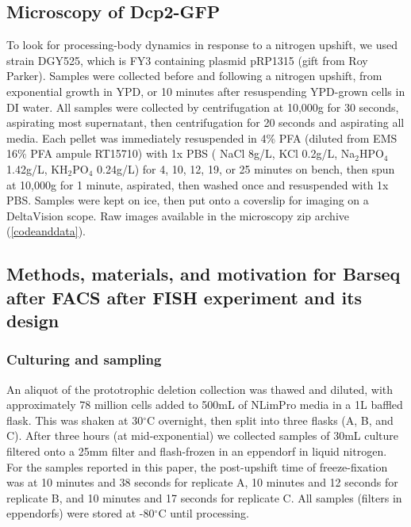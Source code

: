 \subsection{Microscopy of Dcp2-GFP}

To look for processing-body dynamics in response to
a nitrogen upshift, we used strain DGY525, which is FY3
containing plasmid pRP1315 (gift from Roy Parker).
Samples were collected before and following a nitrogen upshift,
from exponential growth in YPD, or 10 minutes after resuspending
YPD-grown cells in DI water.
All samples were collected by centrifugation at 10,000g for 30 seconds, 
aspirating most supernatant, then centrifugation for 20 seconds
and aspirating all media. Each pellet was 
immediately resuspended in 4\% PFA 
(diluted from EMS 16\% PFA ampule RT15710) 
with 1x PBS ( NaCl 8g/L, KCl 0.2g/L, Na$_2$HPO$_4$ 1.42g/L, 
KH$_2$PO$_4$ 0.24g/L) for 4, 10, 12, 19, or 25
minutes on bench, then spun at 10,000g for 1 minute, aspirated, 
then washed once and resuspended with 1x PBS. 
Samples were kept on ice, then put onto a coverslip
for imaging on a DeltaVision scope. Raw images available in the
microscopy zip archive (\autoref{codeanddata}).

\subsection{Methods, materials, and motivation for Barseq after 
FACS after FISH experiment and its design}

\label{section:writeup4}

\subsubsection{Culturing and sampling}

An aliquot of the prototrophic deletion collection
\parencite{vandersluis2014broad} was thawed and diluted, with 
approximately 78 million cells added to 500mL of NLimPro media 
in a 1L baffled flask. This was shaken at 30$^{\circ}$C overnight, 
then split into three flasks (A, B, and C). 
After three hours (at mid-exponential)
we collected samples of 30mL culture filtered onto a 25mm filter and
flash-frozen in an eppendorf in liquid nitrogen. 
For the samples reported in this paper, the
post-upshift time of freeze-fixation was at 10 minutes and 38 seconds
for replicate A, 10 minutes and 12 seconds for replicate B, and 10
minutes and 17 seconds for replicate C. All samples (filters in
eppendorfs) were stored at -80\(^{\circ}\)C until processing.


